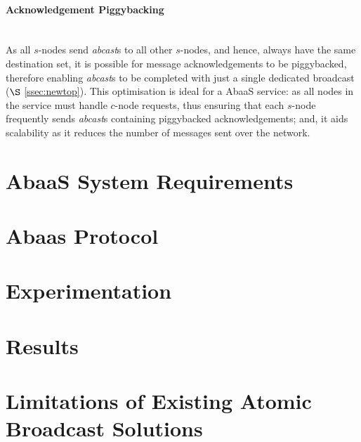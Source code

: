 	\paragraph{Acknowledgement Piggybacking} \hspace{0pt} \\
	As all $s$-nodes send \emph{abcast}s to all other $s$-nodes, and hence, always have the same destination set, it is possible for message acknowledgements to be piggybacked, therefore enabling \emph{abcast}s to be completed with just a single dedicated broadcast ($\S$ \ref{ssec:newtop}).  This optimisation is ideal for a \textsf{AbaaS} service: as all nodes in the service must handle $c$-node requests, thus ensuring that each $s$-node frequently sends \emph{abcast}s containing piggybacked acknowledgements; and, it aids scalability as it reduces the number of messages sent over the network. 

\section{AbaaS System Requirements}
		

\section{Abaas Protocol}

\section{Experimentation}

\section{Results}

\section{Limitations of Existing Atomic Broadcast Solutions}
